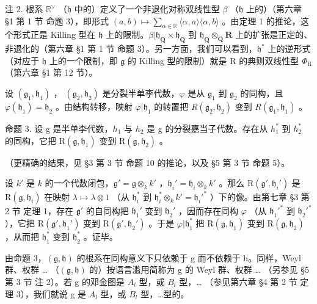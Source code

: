 注 2. 根系 \(\mathbb{R}^{\vee}\) （\(\mathfrak{h}\) 中的）定义了一个非退化对称双线性型 \(\beta\) （\(\mathfrak{h}\) 上的）（第六章 §1 第 1 节 命题 3），即形式 \((a,b)\mapsto \sum_{\alpha \in \mathbb{R}}\langle \alpha ,a\rangle \langle \alpha ,b\rangle\) 。由定理 1 的推论，这个形式正是 Killing 型在 \(\mathfrak{h}\) 上的限制。\(\beta |\mathfrak{h}_{\mathbf{Q}}\times \mathfrak{h}_{\mathbf{Q}}\) 到 \(\mathfrak{h}_{\mathbf{Q}}\otimes_{\mathbf{Q}}\mathbf{R}\) 上的扩张是正定的、非退化的（第六章 §1 第 1 节 命题 3）。另一方面，我们可以看到，\(\mathfrak{h}^*\) 上的逆形式（对应于 \(\mathfrak{h}\) 上的一个限制，即 \(\mathfrak{g}\) 的 Killing 型的限制）就是 R 的典则双线性型 \(\Phi_{\mathrm{R}}\) （第六章 §1 第 12 节）。

设 \((\mathfrak{g}_{1},\mathfrak{h}_{1})\) ， \((\mathfrak{g}_{2},\mathfrak{h}_{2})\) 是分裂半单李代数，\(\varphi\) 是从 \(\mathfrak{g}_{1}\) 到 \(\mathfrak{g}_{2}\) 的同构，且 \(\varphi(\mathfrak{h}_{1})=\mathfrak{h}_{2}\) 。由结构转移，映射 \(\varphi|\mathfrak{h}_{1}\) 的转置把 \(R(\mathfrak{g}_{2},\mathfrak{h}_{2})\) 变到 \(R(\mathfrak{g}_{1},\mathfrak{h}_{1})\) 。

命题 3. 设 g 是半单李代数，\(h_{1}\) 与 \(h_{2}\) 是 g 的分裂嘉当子代数。存在从 \(h_{1}^{*}\) 到 \(h_{2}^{*}\) 的同构，它把 \(\mathrm{R}(\mathfrak{g},\mathfrak{h}_{1})\) 变到 \(\mathrm{R}(\mathfrak{g},\mathfrak{h}_{2})\) 。

（更精确的结果，见 §3 第 3 节 命题 10 的推论，以及 §5 第 3 节 命题 5）。

设 \(k'\) 是 \(k\) 的一个代数闭包，\(\mathfrak{g}' = \mathfrak{g} \otimes_k k'\) ，\(\mathfrak{h}_i' = \mathfrak{h}_i \otimes_k k'\) 。那么 \(\mathrm{R}(\mathfrak{g}', \mathfrak{h}_i')\) 是 \(\mathrm{R}(\mathfrak{g}, \mathfrak{h}_i)\) 在映射 \(\lambda \mapsto \lambda \otimes 1\) （从 \(\mathfrak{h}_i^*\) 到 \(\mathfrak{h}_i^* \otimes_k k' = \mathfrak{h}_i'^*\) ）下的像。由第七章 §3 第 2 节 定理 1，存在 \(\mathfrak{g}'\) 的自同构把 \(\mathfrak{h}_1'\) 变到 \(\mathfrak{h}_2'\) ，因而存在同构 \(\varphi\) （从 \(\mathfrak{h}_1'^*\) 到 \(\mathfrak{h}_2'^*\) ），它把 \(\mathrm{R}(\mathfrak{g}', \mathfrak{h}_1')\) 变到 \(\mathrm{R}(\mathfrak{g}', \mathfrak{h}_2')\) 。于是 \(\varphi | \mathfrak{h}_1^*\) 把 \(\mathrm{R}(\mathfrak{g}, \mathfrak{h}_1)\) 变到 \(\mathrm{R}(\mathfrak{g}, \mathfrak{h}_2)\) ，从而把 \(\mathfrak{h}_1^*\) 变到 \(\mathfrak{h}_2^*\) 。证毕。

由命题 3，\((\mathfrak{g},\mathfrak{h})\) 的根系在同构意义下只依赖于 g 而不依赖于 h。同样，Weyl 群、权群 \ldots{} （\((\mathfrak{g},\mathfrak{h})\) 的）按语言滥用简称为 g 的 Weyl 群、权群 \ldots{} （另参见 §5 第 3 节 注 2）。若 g 的邓金图是 \(A_{l}\) 型，或 \(B_{l}\) 型，\ldots{} （参见第六章 §4 第 2 节 定理 3），我们就说 g 是 \(A_{l}\) 型，或 \(B_{l}\) 型，\ldots 型的。

